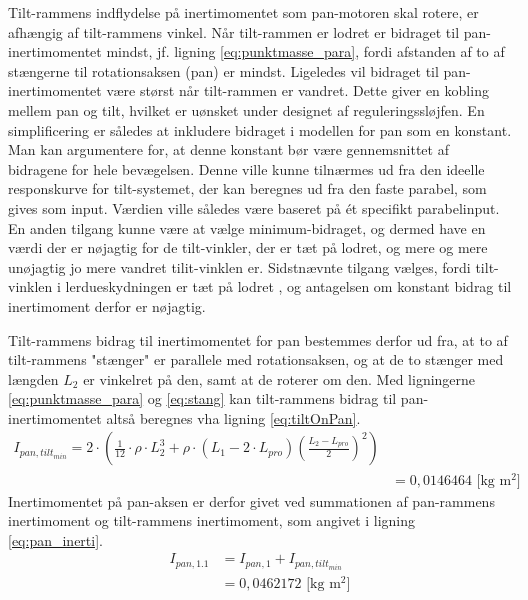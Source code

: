 Tilt-rammens indflydelse på inertimomentet som pan-motoren skal rotere, er afhængig af tilt-rammens vinkel.
Når tilt-rammen er lodret er bidraget til pan-inertimomentet mindst, jf. ligning \ref{eq:punktmasse_para}, fordi afstanden
af to af stængerne til rotationsaksen (pan) er mindst. Ligeledes vil bidraget til pan-inertimomentet være størst når tilt-rammen er vandret.
Dette giver en kobling mellem pan og tilt, hvilket er uønsket under designet af reguleringssløjfen. En simplificering er således at inkludere bidraget i modellen for pan som en konstant.
Man kan argumentere for, at denne konstant bør være gennemsnittet af bidragene for hele bevægelsen.
Denne ville kunne tilnærmes ud fra den ideelle responskurve for tilt-systemet, der kan beregnes ud fra den faste parabel, som gives som input.
Værdien ville således være baseret på ét specifikt parabelinput. En anden tilgang kunne være at vælge minimum-bidraget, og dermed
have en værdi der er nøjagtig for de tilt-vinkler, der er tæt på lodret, og mere og mere unøjagtig jo mere vandret tilit-vinklen er.
Sidstnævnte tilgang vælges, fordi tilt-vinklen i lerdueskydningen er tæt på lodret
,
og antagelsen om konstant bidrag til inertimoment derfor er nøjagtig.

Tilt-rammens bidrag til inertimomentet for pan bestemmes derfor ud fra, at to af tilt-rammens "stænger" er parallele med
rotationsaksen, og at de to stænger med længden \({L_{2}}\) er vinkelret på den, samt at de roterer om den.
Med ligningerne \ref{eq:punktmasse_para} og \ref{eq:stang}
kan tilt-rammens bidrag til pan-inertimomentet altså beregnes vha ligning \ref{eq:tiltOnPan}.
\begin{align}
I_{pan,tilt_{min}}=2\cdot{}\left(\frac{1}{12}\cdot{}\rho\cdot{}L_{2}^3
+\rho\cdot{}\left(L_1-2\cdot{}L_{pro}\right)\left(\frac{L_2-L_{pro}}{2}\right)^2\right)
\\
&=0,0146464 \text{ [kg m$^2$]}
\label{eq:tiltOnPan} 
\end{align}
Inertimomentet på pan-aksen er derfor givet ved summationen af pan-rammens inertimoment og tilt-rammens inertimoment,
som angivet i ligning \ref{eq:pan_inerti}.
\begin{align}
{ I }_{ pan,1.1 } &= I_{ pan,1 }+I_ { pan,tilt_{ min} }
\\&=0,0462172 \text{ [kg m$^2$]}
\label{eq:pan_inerti} 
\end{align}

